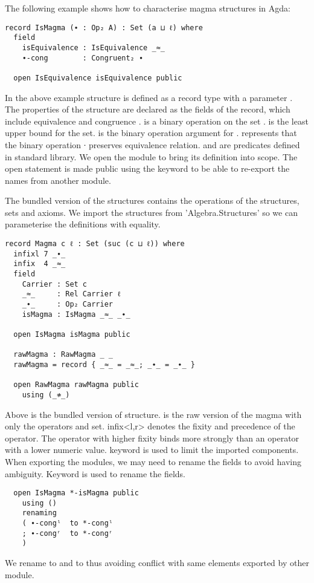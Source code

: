 The following example shows how to characterise magma
structures in Agda:
\begin{verbatim}
record IsMagma (∙ : Op₂ A) : Set (a ⊔ ℓ) where
  field
    isEquivalence : IsEquivalence _≈_
    ∙-cong        : Congruent₂ ∙

  open IsEquivalence isEquivalence public
\end{verbatim}
In the above example structure  is defined as a record type with
a parameter . The properties of the structure  are
declared as the fields of the record, which include equivalence
 and congruence .  is a binary
operation on the set .  is the least upper bound for the
set.  is the binary operation argument for .
 represents that the binary operation ∙ preserves
equivalence relation.  and  are
predicates defined in standard library. We open the module
 to bring its definition into scope. The open statement is
made public using the keyword  to be able to re-export the names
from another module.

The bundled version of the structures contains the operations of the structures,
sets and axioms. We import the structures from 'Algebra.Structures' so we can
parameterise the definitions with equality. 

\begin{verbatim}
record Magma c ℓ : Set (suc (c ⊔ ℓ)) where
  infixl 7 _∙_
  infix  4 _≈_
  field
    Carrier : Set c
    _≈_     : Rel Carrier ℓ
    _∙_     : Op₂ Carrier
    isMagma : IsMagma _≈_ _∙_

  open IsMagma isMagma public

  rawMagma : RawMagma _ _
  rawMagma = record { _≈_ = _≈_; _∙_ = _∙_ }

  open RawMagma rawMagma public
    using (_≉_)
\end{verbatim}
Above is the bundled version of  structure.  is
the raw version of the magma with only the operators and set. infix<l,r> denotes
the fixity and precedence of the operator. The operator with higher fixity binds
more strongly than an operator with a lower numeric value. 
keyword is used to limit the imported components. When exporting the modules, we
may need to rename the fields to avoid having ambiguity. Keyword
 is used to rename the fields.
\label{code:rename}
\begin{verbatim}
  open IsMagma *-isMagma public
    using ()
    renaming
    ( ∙-congˡ  to *-congˡ
    ; ∙-congʳ  to *-congʳ
    )
\end{verbatim} 
We rename   to  and   to
 thus avoiding conflict with same elements exported by other
module.


